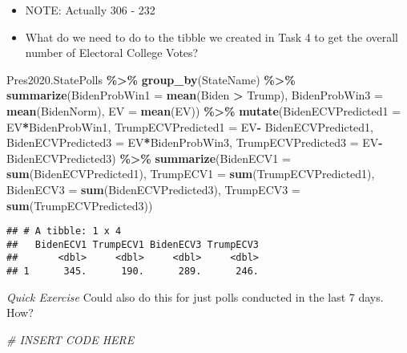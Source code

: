 \documentclass[
]{article}
\newenvironment{Shaded}{\begin{snugshade}}{\end{snugshade}}
\newcommand{\AttributeTok}[1]{\textcolor[rgb]{0.13,0.29,0.53}{#1}}
\newcommand{\CommentTok}[1]{\textcolor[rgb]{0.56,0.35,0.01}{\textit{#1}}}
\newcommand{\FunctionTok}[1]{\textcolor[rgb]{0.13,0.29,0.53}{\textbf{#1}}}
\newcommand{\NormalTok}[1]{#1}
\newcommand{\SpecialCharTok}[1]{\textcolor[rgb]{0.81,0.36,0.00}{\textbf{#1}}}
\providecommand{\tightlist}{%
  \setlength{\itemsep}{0pt}\setlength{\parskip}{0pt}}
\begin{document}
\begin{itemize}
\tightlist
\item
  NOTE: Actually 306 - 232
\item
  What do we need to do to the tibble we created in Task 4 to get the
  overall number of Electoral College Votes?
\end{itemize}

\begin{Shaded}
\begin{Highlighting}[]
\NormalTok{Pres2020.StatePolls }\SpecialCharTok{\%\textgreater{}\%}  
  \FunctionTok{group\_by}\NormalTok{(StateName) }\SpecialCharTok{\%\textgreater{}\%}
    \FunctionTok{summarize}\NormalTok{(}\AttributeTok{BidenProbWin1 =} \FunctionTok{mean}\NormalTok{(Biden }\SpecialCharTok{\textgreater{}}\NormalTok{ Trump),}
              \AttributeTok{BidenProbWin3 =} \FunctionTok{mean}\NormalTok{(BidenNorm),}
              \AttributeTok{EV =} \FunctionTok{mean}\NormalTok{(EV)) }\SpecialCharTok{\%\textgreater{}\%}
    \FunctionTok{mutate}\NormalTok{(}\AttributeTok{BidenECVPredicted1 =}\NormalTok{ EV}\SpecialCharTok{*}\NormalTok{BidenProbWin1,}
              \AttributeTok{TrumpECVPredicted1 =}\NormalTok{ EV}\SpecialCharTok{{-}}\NormalTok{ BidenECVPredicted1,}
              \AttributeTok{BidenECVPredicted3 =}\NormalTok{ EV}\SpecialCharTok{*}\NormalTok{BidenProbWin3,}
              \AttributeTok{TrumpECVPredicted3 =}\NormalTok{ EV}\SpecialCharTok{{-}}\NormalTok{ BidenECVPredicted3) }\SpecialCharTok{\%\textgreater{}\%}
    \FunctionTok{summarize}\NormalTok{(}\AttributeTok{BidenECV1 =} \FunctionTok{sum}\NormalTok{(BidenECVPredicted1),}
              \AttributeTok{TrumpECV1 =} \FunctionTok{sum}\NormalTok{(TrumpECVPredicted1),}
              \AttributeTok{BidenECV3 =} \FunctionTok{sum}\NormalTok{(BidenECVPredicted3),}
              \AttributeTok{TrumpECV3 =} \FunctionTok{sum}\NormalTok{(TrumpECVPredicted3))}
\end{Highlighting}
\end{Shaded}

\begin{verbatim}
## # A tibble: 1 x 4
##   BidenECV1 TrumpECV1 BidenECV3 TrumpECV3
##       <dbl>     <dbl>     <dbl>     <dbl>
## 1      345.      190.      289.      246.
\end{verbatim}

\emph{Quick Exercise} Could also do this for just polls conducted in the
last 7 days. How?

\begin{Shaded}
\begin{Highlighting}[]
\CommentTok{\# INSERT CODE HERE}
\end{Highlighting}
\end{Shaded}
\end{document}
